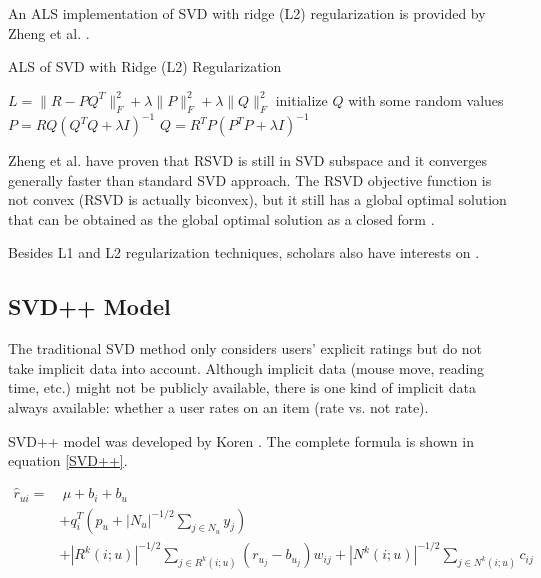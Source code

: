 \documentclass[letter paper, 11pt]{article}
\begin{document}
	An ALS implementation of SVD with ridge (L2) regularization is provided by Zheng et al. \cite{RSVD}.
	
	\renewcommand{\algorithmicrequire}{\textbf{Input:}}
	
	\begin{algorithm}
		\caption{ALS of SVD with Ridge (L2) Regularization\cite{RSVD}}
		\label{L1}
		\begin{algorithmic}
			\STATE $L = \| R - P Q^T \|_F^2 + \lambda \| P \|_F^2 + \lambda \| Q \|_F^2$
			\STATE initialize $Q$ with some random values
			\REPEAT
				\STATE $ P = R Q(Q^TQ + \lambda I)^{-1} $
				\STATE $ Q = R^T P(P^T P + \lambda I)^{-1} $
		\end{algorithmic}
	\end{algorithm}

	Zheng et al. \cite{RSVD} have proven that RSVD is still in SVD subspace and it converges generally faster than standard SVD approach. The RSVD objective function is not convex (RSVD is actually biconvex), but it still has a global optimal solution that can be obtained as the global optimal solution as a closed form \cite{RSVD}.
	
	Besides L1 and L2 regularization techniques, scholars also have interests on .
	



	\subsection{SVD++ Model}
	
	The traditional SVD method only considers users' explicit ratings but do not take implicit data into account. Although implicit data (mouse move, reading time, etc.) might not be publicly available, there is one kind of implicit data always available: whether a user rates on an item (rate vs. not rate). 
	
	
	SVD++ model was developed by Koren \cite{korenFactorization}. The complete formula is shown in equation \ref{SVD++}. 
	
	\begin{equation} \label{SVD++}
		\begin{split}
			\hat{r}_{ui} =& \ \mu + b_i + b_u \\ 
			& + q_i^T  (p_u + |N_u|^{-1/2} \sum_{j \in N_u}y_j) \\ 
			& + |R^k(i; u)|^{-1/2} \sum_{j \in R^k(i; u)} (r_{u_j} - b_{u_j}) w_{ij} + |N^k(i; u)|^{-1/2} \sum_{j \in N^k(i; u)} c_{ij}
		\end{split}
	\end{equation}
	
\end{document}
